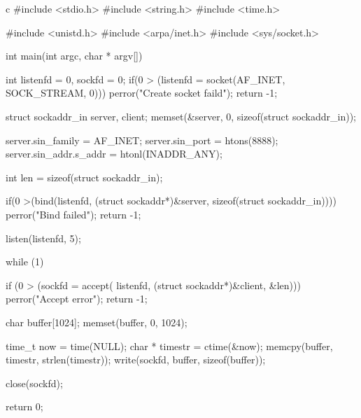 \begin{code-block}{c}
#include <stdio.h>
#include <string.h>
#include <time.h>

#include <unistd.h>
#include <arpa/inet.h>
#include <sys/socket.h>

int main(int argc, char * argv[])
{

        int listenfd = 0, sockfd = 0;
        if(0 > (listenfd = socket(AF_INET, SOCK_STREAM, 0)))
        {
                perror("Create socket faild");
                return -1;
        }

        struct sockaddr_in server, client;
        memset(&server, 0, sizeof(struct sockaddr_in));

        server.sin_family = AF_INET;
        server.sin_port = htons(8888);
        server.sin_addr.s_addr = htonl(INADDR_ANY);

        int len = sizeof(struct sockaddr_in);

        if(0 >(bind(listenfd,
                (struct sockaddr*)&server, sizeof(struct sockaddr_in))))
        {
                perror("Bind failed");
                return -1;
        }

        listen(listenfd, 5);

        while (1)
        {
                if (0 > (sockfd = accept(
                        listenfd, (struct sockaddr*)&client, &len)))
                {
                        perror("Accept error");
                        return -1;
                }

                char buffer[1024];
                memset(buffer, 0, 1024);

                time_t now = time(NULL);
                char * timestr = ctime(&now);
                memcpy(buffer, timestr, strlen(timestr));
                write(sockfd, buffer, sizeof(buffer));

                close(sockfd);
        }
        return 0;
}
\end{code-block}
